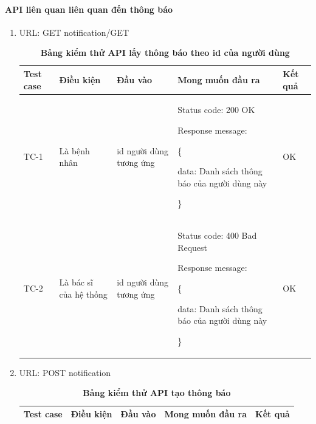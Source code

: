 \paragraph{API liên quan liên quan đến thông báo}
\mbox{}
\begin{enumerate}
  \item URL: GET notification/GET
    \begin{xltabular}{\textwidth}{
    | >{\raggedright\arraybackslash}p{1cm}
    | >{\raggedright\arraybackslash}p{2.5cm}
    | >{\raggedright\arraybackslash}X
    | >{\raggedright\arraybackslash}X
    | >{\raggedright\arraybackslash}p{1cm}|
    }
    \caption{\bfseries \fontsize{12pt}{0pt}\selectfont Bảng kiểm thử API lấy thông báo theo id của người dùng}
    \\
    \hline
    \bfseries Test case    &\bfseries Điều kiện   &\bfseries Đầu vào 
    &\bfseries Mong muốn đầu ra &\bfseries Kết quả\\ \hline
  
  
    TC-1
    & Là bệnh nhân
    & id người dùng tương ứng
    & 
  
    Status code: 200 OK
  
      Response message:
  
      \{

    data: Danh sách thông báo của người dùng này
  
    \}
    
    & OK
  
    \\ \hline

    TC-2
    & Là bác sĩ của hệ thống
    & id người dùng tương ứng
    & 
  
    Status code: 400 Bad Request
  
      Response message:
  
      \{

    data: Danh sách thông báo của người dùng này
  
    \}
    
    & OK
  
    \\ \hline
  
    \end{xltabular}

  \item URL: POST notification
    \begin{xltabular}{\textwidth}{
    | >{\raggedright\arraybackslash}p{1cm}
    | >{\raggedright\arraybackslash}p{2.5cm}
    | >{\raggedright\arraybackslash}X
    | >{\raggedright\arraybackslash}X
    | >{\raggedright\arraybackslash}p{1cm}|
    }
    \caption{\bfseries \fontsize{12pt}{0pt}\selectfont Bảng kiểm thử API tạo thông báo}
    \\
    \hline
    \bfseries Test case    &\bfseries Điều kiện   &\bfseries Đầu vào 
    &\bfseries Mong muốn đầu ra &\bfseries Kết quả\\ \hline
  

\end{xltabular}
\end{enumerate}
